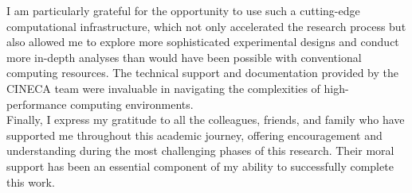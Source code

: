 \documentclass[12pt,a4paper]{article}
\begin{document}
I am particularly grateful for the opportunity to use such a cutting-edge computational infrastructure, which not only accelerated the research process but also allowed me to explore more sophisticated experimental designs and conduct more in-depth analyses than would have been possible with conventional computing resources. The technical support and documentation provided by the CINECA team were invaluable in navigating the complexities of high-performance computing environments.\\

Finally, I express my gratitude to all the colleagues, friends, and family who have supported me throughout this academic journey, offering encouragement and understanding during the most challenging phases of this research. Their moral support has been an essential component of my ability to successfully complete this work.\\



\end{document}
